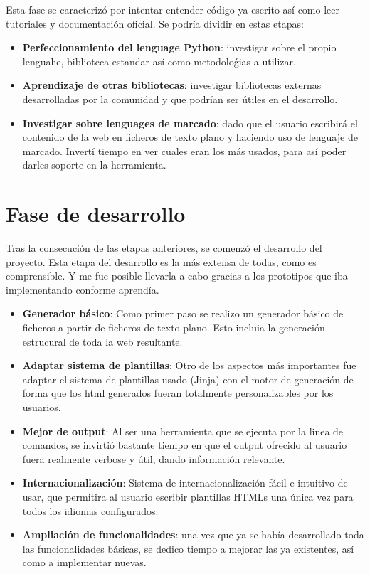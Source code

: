 Esta fase se caracterizó por intentar entender código ya escrito así como leer tutoriales y documentación
oficial. Se podría dividir en estas etapas:

\begin{itemize}
\item \textbf{Perfeccionamiento del lenguage Python}: investigar sobre el propio lenguahe, biblioteca estandar
así como metodoloǵias a utilizar.
\item \textbf{Aprendizaje de otras bibliotecas}: investigar bibliotecas externas desarrolladas por la comunidad y
que podrían ser útiles en el desarrollo.
\item \textbf{Investigar sobre lenguages de marcado}: dado que el usuario escribirá el contenido de la web en ficheros
de texto plano y haciendo uso de lenguaje de marcado. Invertí tiempo en ver cuales eran los más usados, para así poder
darles soporte en la herramienta.
\end{itemize}

\section{Fase de desarrollo}

Tras la consecución de las etapas anteriores, se comenzó el desarrollo del proyecto. Esta etapa del desarrollo 
es la más extensa de todas, como es comprensible. Y me fue posible llevarla a cabo gracias a los
prototipos que iba implementando conforme aprendía.

\begin{itemize}
\item \textbf{Generador básico}: Como primer paso se realizo un generador básico de ficheros a partir 
de ficheros de texto plano. Esto incluia la generación estrucural de toda la web resultante.
\item \textbf{Adaptar sistema de plantillas}: Otro de los aspectos más importantes fue adaptar el sistema 
de plantillas usado (Jinja) con el motor de generación de forma que los html generados fueran totalmente
personalizables por los usuarios.
\item \textbf{Mejor de output}: Al ser una herramienta que se ejecuta por la linea de comandos, se invirtió
bastante tiempo en que el output ofrecido al usuario fuera realmente verbose y útil, dando información relevante.
\item \textbf{Internacionalización}: Sistema de internacionalización fácil e intuitivo de usar, que permitira al usuario
escribir plantillas HTMLs una única vez para todos los idiomas configurados.
\item \textbf{Ampliación de funcionalidades}: una vez que ya se había desarrollado toda las funcionalidades básicas,
se dedico tiempo a mejorar las ya existentes, así como a implementar nuevas.
\end{itemize}


